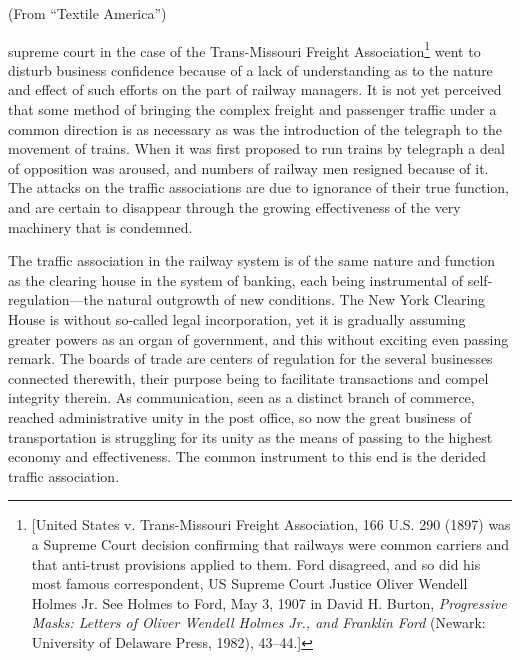 \documentclass[openany,nobib]{tufte-book}
\begin{document}
\vspace{.2in}

\begin{LARGE}


\end{LARGE}

\vspace{0.5in}



\noindent (From ``Textile America'')

 supreme court in the case of the Trans-Missouri
Freight Association\footnote{{[}United States v. Trans-Missouri Freight
  Association, 166 U.S. 290 (1897) was a Supreme Court decision
  confirming that railways were common carriers and that anti-trust
  provisions applied to them. Ford disagreed, and so did his most famous
  correspondent, US Supreme Court Justice Oliver Wendell Holmes Jr. See
  Holmes to Ford, May 3, 1907 in David H. Burton, \emph{Progressive
  Masks: Letters of Oliver Wendell Holmes Jr., and Franklin Ford}
  (Newark: University of Delaware Press, 1982), 43--44.{]}} went to
disturb business confidence because of a lack of understanding as to the
nature and effect of such efforts on the part of railway managers. It is
not yet perceived that some method of bringing the complex freight and
passenger traffic under a common direction is as necessary as was the
introduction of the telegraph to the movement of trains. When it was
first proposed to run trains by telegraph a deal of opposition was
aroused, and numbers of railway men resigned because of it. The attacks
on the traffic associations are due to ignorance of their true function,
and are certain to disappear through the growing effectiveness of the
very machinery that is condemned.

The traffic association in the railway system is of the same nature and
function as the clearing house in the system of banking, each being
instrumental of self-regulation---the natural outgrowth of new
conditions. The New York Clearing House is without so-called legal
incorporation, yet it is gradually assuming greater powers as an organ
of government, and this without exciting even passing remark. The boards
of trade are centers of regulation for the several businesses connected
therewith, their purpose being to facilitate transactions and compel
integrity therein. As communication, seen as a distinct branch of
commerce, reached administrative unity in the post office, so now the
great business of transportation is struggling for its unity as the
means of passing to the highest economy and effectiveness. The common
instrument to this end is the derided traffic association.
\end{document}
